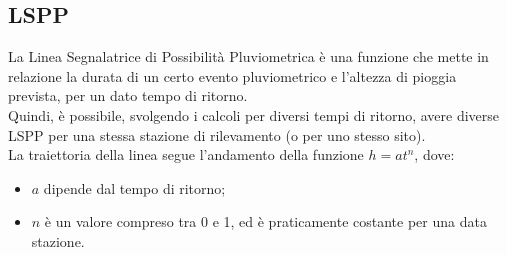 \subsection{LSPP}
La Linea Segnalatrice di Possibilità Pluviometrica è una funzione che mette in relazione la durata di un certo evento pluviometrico e l'altezza di pioggia prevista, per un dato tempo di ritorno.\\
Quindi, è possibile, svolgendo i calcoli per diversi tempi di ritorno, avere diverse LSPP per una stessa stazione di rilevamento (o per uno stesso sito).\\
La traiettoria della linea segue l'andamento della funzione $h=at^n$, dove:
\begin{itemize}
\item $a$ dipende dal tempo di ritorno;    
\item $n$ è un valore compreso tra 0 e 1, ed è praticamente costante per una data stazione.
\end{itemize}
